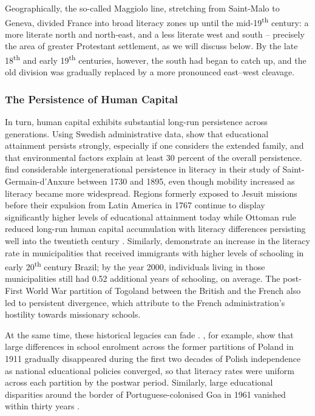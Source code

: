 \documentclass[12pt]{article}
\begin{document}
Geographically, the so-called Maggiolo line, stretching from Saint-Malo to Geneva, divided France into broad literacy zones up until the mid-19\textsuperscript{th} century: a more literate north and north-east, and a less literate west and south \parencite{furetReadingWritingLiteracy1983} -- precisely the area of greater Protestant settlement, as we will discuss below. By the late 18\textsuperscript{th} and early 19\textsuperscript{th} centuries, however, the south had began to catch up, and the old division was gradually replaced by a more pronounced east--west cleavage.

\subsubsection{The Persistence of Human Capital}

In turn, human capital exhibits substantial long-run persistence across generations. Using Swedish administrative data, \textcite{adermonDynasticHumanCapital2021} show that educational attainment persists strongly, especially if one considers the extended family, and that environmental factors explain at least 30 percent of the overall persistence. \textcite{blancChangePersistenceAge2020} find considerable intergenerational persistence in literacy in their study of Saint-Germain-d'Anxure between 1730 and 1895, even though mobility increased as literacy became more widespread. Regions formerly exposed to Jesuit missions before their expulsion from Latin America in 1767 continue to display significantly higher levels of educational attainment today \parencite{valenciacaicedoMissionHumanCapital2019} while Ottoman rule reduced long-run human capital accumulation with literacy differences persisting well into the twentieth century \parencite{popescuImperialRuleLongRun2022}. Similarly, \textcite{rochaHumanCapitalPersistence2017} demonstrate an increase in the literacy rate in municipalities that received immigrants with higher levels of schooling in early 20\textsuperscript{th} century Brazil; by the year 2000, individuals living in those municipalities still had 0.52 additional years of schooling, on average. The post-First World War partition of Togoland between the British and the French also led to persistent divergence, which \textcite{cogneauBordersThatDivide2014} attribute to the French administration's hostility towards missionary schools. 

At the same time, these historical legacies can fade \parencite{abadHistoryNeverReally2021}. \textcite{backhausFadingLegaciesHuman2019}, for example, show that large differences in school enrolment across the former partitions of Poland in 1911 gradually disappeared during the first two decades of Polish independence as national educational policies converged, so that literacy rates were uniform across each partition by the postwar period. Similarly, large educational disparities around the border of Portuguese-colonised Goa in 1961 vanished within thirty years \parencite{lehnerCultureInstitutionsFading}.
\end{document}
